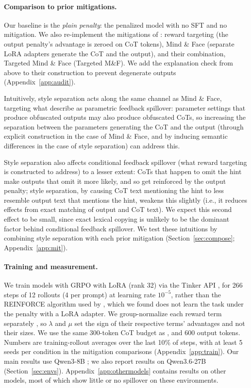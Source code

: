 \documentclass{article}
\begin{document}
\paragraph{Comparison to prior mitigations.} Our baseline is the \emph{plain penalty}: the penalized model with no SFT and no mitigation. We also re-implement the mitigations of \citet{drori2025output}: reward targeting (the output penalty's advantage is zeroed on CoT tokens), Mind \& Face (separate LoRA adapters generate the CoT and the output), and their combination, Targeted Mind \& Face (Targeted M\&F). We add the explanation check from above to their construction to prevent degenerate outputs (Appendix~\ref{app:audit}).

Intuitively, style separation acts along the same channel as Mind \& Face, targeting what \citet{drori2025output} describe as parametric feedback spillover: parameter settings that produce obfuscated outputs may also produce obfuscated CoTs, so increasing the separation between the parameters generating the CoT and the output (through explicit construction in the case of Mind \& Face, and by inducing semantic differences in the case of style separation) can address this.

Style separation also affects conditional feedback spillover (what reward targeting is constructed to address) to a lesser extent: CoTs that happen to omit the hint make outputs that omit it more likely, and so get reinforced by the output penalty; style separation, by causing CoT text mentioning the hint to less resemble output text that mentions the hint, weakens this slightly (i.e., it reduces effects from exact matching of output and CoT text). We expect this second effect to be small, since exact lexical copying is unlikely to be the dominant factor behind conditional feedback spillover. We test these intuitions by combining style separation with each prior mitigation (Section~\ref{sec:compose}; Appendix~\ref{app:mit}).

\paragraph{Training and measurement.} We train models with GRPO \citep{shao2024deepseekmath} with LoRA (rank 32) via the Tinker API \citep{tinker2025}, for 266 steps of 12 rollouts (4 per prompt) at learning rate $10^{-5}$, rather than the REINFORCE algorithm \citep{williams1992reinforce} used by \citet{drori2025output}, which we found does not learn the task under the penalty with a LoRA adapter. We group-normalize each reward term separately \citep[as in][]{liu2026gdpo}, so $\lambda$ and $\mu$ set the sign of their respective terms' advantages and not their sizes. We use the same 300-token CoT budget as \citet{drori2025output}, and 600 output tokens. Numbers are training-rollout averages over the last 10\% of steps, with at least 5 seeds per condition in the mitigation comparisons (Appendix~\ref{app:train}). Our main results use Qwen3-8B \citep{qwen3}; we also report results on Qwen3.6-27B (Section~\ref{sec:envs}). Appendix~\ref{app:othermodels} contains results on other models, most of which show little or no spillover on these environments.
\end{document}
